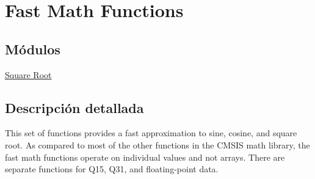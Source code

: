 \hypertarget{group__group_fast_math}{}\section{Fast Math Functions}
\label{group__group_fast_math}
\subsection*{Módulos}
\begin{DoxyCompactItemize}
\item 
\hyperlink{group___s_q_r_t}{Square Root}
\end{DoxyCompactItemize}


\subsection{Descripción detallada}
This set of functions provides a fast approximation to sine, cosine, and square root. As compared to most of the other functions in the C\+M\+S\+IS math library, the fast math functions operate on individual values and not arrays. There are separate functions for Q15, Q31, and floating-\/point data. 